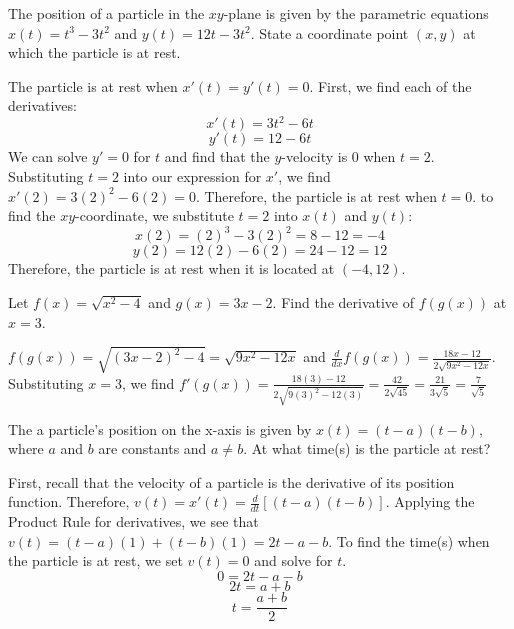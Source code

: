 \begin{Exercise} The position 
	of a particle in the $xy$-plane is given by the parametric equations 
	$x(t) = t^3-3t^2$ and $y(t) = 12t-3t^2$. State a coordinate point 
	$(x,y)$ at which the particle is at rest. 
\end{Exercise}
	
\begin{Answer}[ref=deriv_rules3]
	The particle is at rest when $x'(t) = y'(t) = 0$. First, we find each
	of the derivatives:\\
	$$x'(t) = 3t^2 - 6t$$
	$$y'(t) = 12 - 6t$$
	We can solve $y' = 0$ for $t$ and find that the $y$-velocity is $0$ 
	when $t=2$. Substituting $t=2$ into our expression for $x'$, we find 
	$x'(2) = 3(2)^2 - 6(2) = 0$. Therefore, the particle is at rest when 
	$t=0$. to find the $xy$-coordinate, we substitute $t=2$ into $x(t)$ 
	and $y(t)$:\\
	$$x(2) = (2)^3 - 3(2)^2 = 8 - 12 = -4$$
	$$y(2) = 12(2) - 6(2) = 24 - 12 = 12$$
	Therefore, the particle is at rest when it is located at $(-4, 12)$. 
\end{Answer}

\begin{Exercise}
    [label=deriv_rules4]
    Let $f(x) = \sqrt{x^2-4}$ and $g(x) = 3x-2$. Find the derivative 
    of $f(g(x))$ at $x=3$.
\end{Exercise}
\begin{Answer}
    [ref=deriv_rules4]
    $f(g(x)) = \sqrt{(3x - 2)^2 - 4} = \sqrt{9x^2 - 12x}$ and 
    $\frac{d}{dx}f(g(x)) = \frac{18x - 12}{2\sqrt{9x^2 - 12x}}$. 
    Substituting $x = 3$, we find $f'(g(x)) = \frac{18(3) - 12}{2
    \sqrt{9(3)^2 - 12(3)}} = \frac{42}{2\sqrt{45}} = 
    \frac{21}{3\sqrt{5}} = \frac{7}{\sqrt{5}}$
\end{Answer}

\begin{Exercise}
    [label=deriv_rules5]
    The a particle's position on the x-axis is given by $x(t) = 
    (t - a)(t - b)$, where $a$ and $b$ are constants and $a \neq b$. 
    At what time(s) is the particle at rest?
\end{Exercise}
\begin{Answer}
    [ref=deriv_rules5]
    First, recall that the velocity of a particle is the derivative of 
    its position function. Therefore, $v(t) = x'(t) = 
    \frac{d}{dt}[(t - a)(t - b)]$. Applying the Product Rule for 
    derivatives, we see that $v(t) = (t - a)(1) + (t - b)(1) = 2t - a 
    - b$. To find the time(s) when the particle is at rest, we set 
    $v(t) = 0$ and solve for $t$. 
    $$0 = 2t - a - b$$ 
    $$2t = a + b$$ 
    $$t = \frac{a + b}{2}$$
\end{Answer}

